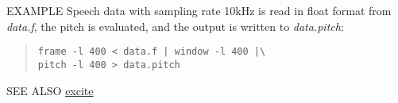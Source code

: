 \begin{qsection}{EXAMPLE}
Speech data with sampling rate 10kHz is read in float format
from {\em data.f}, the pitch is evaluated, and
the output is written to {\em data.pitch}:
\begin{quote}
  \verb!frame -l 400 < data.f | window -l 400 |\ !\\
  \verb!pitch -l 400 > data.pitch!
\end{quote}
\end{qsection}

\begin{qsection}{SEE ALSO}
\hyperlink{excite}{excite}
\end{qsection}
